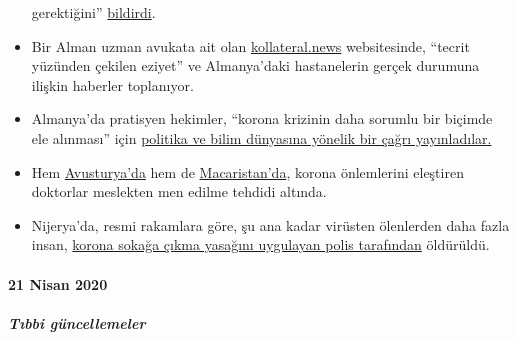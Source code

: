 \begin{itemize}
  gerektiğini''
  \href{https://norberthaering.de/medienversagen/radiomuenchen-blm-meinungsvielfalt/}{bildirdi}.
\item
  Bir Alman uzman avukata ait olan
  \href{https://kollateral.news/}{kollateral.news} websitesinde,
  ``tecrit yüzünden çekilen eziyet'' ve Almanya'daki hastanelerin gerçek
  durumuna ilişkin haberler toplanıyor.
\item
  Almanya'da pratisyen hekimler, ``korona krizinin daha sorumlu bir
  biçimde ele alınması'' için
  \href{https://aerzteinnenvorort.de/der-appell}{politika ve bilim
  dünyasına yönelik bir çağrı yayınladılar.}
\item
  Hem
  \href{https://www.sn.at/panorama/oesterreich/arzt-droht-berufsverbot-wegen-kritik-an-corona-massnahmen-86594140}{Avusturya'da}
  hem de
  \href{https://magyarhang.org/belfold/2020/04/16/etikai-vizsgalat-indul-az-orvos-ellen-aki-szerint-nincs-jarvany-es-az-idosek-csak-a-felelemtol-halnak-meg/}{Macaristan'da},
  korona önlemlerini eleştiren doktorlar meslekten men edilme tehdidi
  altında.
\item
  Nijerya'da, resmi rakamlara göre, şu ana kadar virüsten ölenlerden
  daha fazla insan,
  \href{https://www.bbc.com/news/world-africa-52317196}{korona sokağa
  çıkma yasağını uygulayan polis tarafından} öldürüldü.
\end{itemize}

\hypertarget{21-nisan-2020}{%
\paragraph{21 Nisan 2020}\label{21-nisan-2020}}

\hypertarget{tux131bbi-guxfcncellemeler-1}{%
\subparagraph{\texorpdfstring{\textbf{Tıbbi
güncellemeler}}{Tıbbi güncellemeler}}\label{tux131bbi-guxfcncellemeler-1}}

